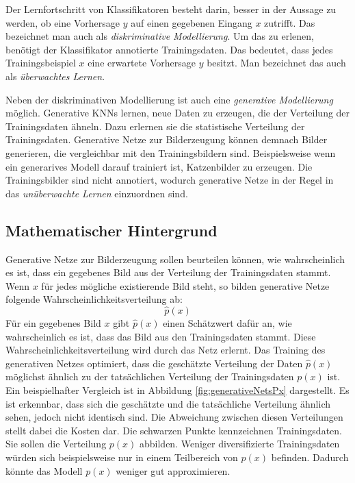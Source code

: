 \label{chap:NoGANs}

Der Lernfortschritt von Klassifikatoren besteht darin, besser in der Aussage zu werden, ob eine Vorhersage $y$ auf einen gegebenen Eingang $x$ zutrifft. Das bezeichnet man auch als \emph{diskriminative Modellierung}. Um das zu erlenen, benötigt der Klassifikator annotierte Trainingsdaten. Das bedeutet, dass jedes Trainingsbeispiel $x$ eine erwartete Vorhersage $y$ besitzt. Man bezeichnet das auch als \emph{überwachtes Lernen}. \cite{generative-modellierung}

Neben der diskriminativen Modellierung ist auch eine \emph{generative Modellierung} möglich. Generative \acp{KNN} lernen, neue Daten zu erzeugen, die der Verteilung der Trainingsdaten ähneln. Dazu erlernen sie die statistische Verteilung der Trainingsdaten. Generative Netze zur Bilderzeugung können demnach Bilder generieren, die vergleichbar mit den Trainingsbildern sind. Beispielsweise wenn ein generarives Modell darauf trainiert ist, Katzenbilder zu erzeugen. Die Trainingsbilder sind nicht annotiert, wodurch generative Netze in der Regel in das \emph{unüberwachte Lernen} einzuordnen sind. \cite{generative-modellierung}

\subsection{Mathematischer Hintergrund}
Generative Netze zur Bilderzeugung sollen beurteilen können, wie wahrscheinlich es ist, dass ein gegebenes Bild aus der Verteilung der Trainingsdaten stammt. Wenn $x$ für jedes mögliche existierende Bild steht, so bilden generative Netze folgende Wahrscheinlichkeitsverteilung ab: \cite{generative-modellierung}
\begin{equation}
   \hat{p}(x)
\end{equation}
Für ein gegebenes Bild $x$ gibt $\hat{p}(x)$ einen Schätzwert dafür an, wie wahrscheinlich es ist, dass das Bild aus den Trainingsdaten stammt. Diese Wahrscheinlichkeitsverteilung wird durch das Netz erlernt. Das Training des generativen Netzes optimiert, dass die geschätzte Verteilung der Daten $\hat{p}(x)$ möglichst ähnlich zu der tatsächlichen Verteilung der Trainingsdaten $p(x)$ ist. Ein beispielhafter Vergleich ist in Abbildung \ref{fig:generativeNetsPx} dargestellt. Es ist erkennbar, dass sich die geschätzte und die tatsächliche Verteilung ähnlich sehen, jedoch nicht identisch sind. Die Abweichung zwischen diesen Verteilungen stellt dabei die Kosten dar. Die schwarzen Punkte kennzeichnen Trainingsdaten. Sie sollen die Verteilung $p(x)$ abbilden. Weniger diversifizierte Trainingsdaten würden sich beispielsweise nur in einem Teilbereich von $p(x)$ befinden. Dadurch könnte das Modell $p(x)$ weniger gut approximieren. \cite{generative-modellierung} \cite{openAiGenerativeNets}

